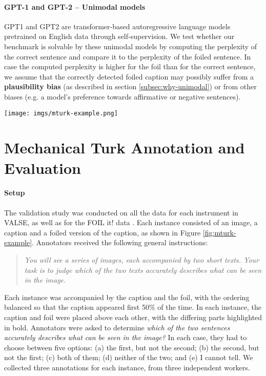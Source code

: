 \documentclass[11pt]{article}
\newcommand{\dataset}{VALSE}
\begin{document}
\paragraph{GPT-1 and GPT-2 -- Unimodal models}
GPT1 \cite{radford2018improving} and GPT2 \cite{radford2019language} are transformer-based autoregressive language models pretrained on English data through self-supervision. We test whether our benchmark is solvable by these unimodal models by computing the perplexity of the correct sentence and compare it to the perplexity of the foiled sentence. In case the computed perplexity is higher for the foil than for the correct sentence,
we assume that the correctly detected foiled caption may possibly suffer
from a \textbf{plausibility bias} (as described in section \ref{subsec:why-unimodal}) or from other biases (e.g. a model's preference towards affirmative or negative sentences).

\begin{figure*}[t]
    \centering
    \texttt{[image: imgs/mturk-example.png]}
    \caption{Example of an instance from the validation study. The example is from the counting piece, {\em adversarial} instrument (see Section \ref{subsec:counting}).}
    \label{fig:mturk-example}
\end{figure*}

\section{Mechanical Turk Annotation and Evaluation}\label{app:mturk}
\paragraph{Setup} 
The validation study was conducted on all the data for each instrument in \dataset{}, as well as for the FOIL it! data \cite{shekhar-etal-2019-beyond}. Each instance consisted of an image, a caption and a foiled version of the caption, as shown in Figure \ref{fig:mturk-example}. Annotators received the following general instructions:

\begin{quote}
    \emph{
    You will see a series of images, each accompanied by two short texts. Your task is to judge which of the two texts accurately describes what can be seen in the image. }
\end{quote}

Each instance was accompanied by the caption and the foil, with the ordering balanced so that the caption appeared first 50\% of the time. In each instance, the caption and foil were placed above each other, with the differing parts highlighted in bold. Annotators were asked to determine {\em which of the two sentences accurately describes what can be seen in the image?} In each case, they had to choose between five options: (a) the first, but not the second; (b) the second, but not the first; (c) both of them; (d) neither of the two; and (e) I cannot tell. We collected three annotations for each instance, from three independent workers. 
\end{document}
